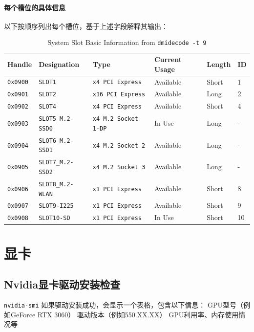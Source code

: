 \paragraph{每个槽位的具体信息}
以下按顺序列出每个槽位，基于上述字段解释其输出：
\begin{table}[h]
    \centering
    \small %
    \setlength{\tabcolsep}{4pt} %
    \begin{tabular}{@{}p{1.5cm}p{2.5cm}p{3cm}p{2cm}p{1.5cm}p{1cm}@{}}
        \toprule
        Handle & Designation & Type & Current Usage & Length & ID \\
        \midrule
        \texttt{0x0900} & \texttt{SLOT1} & \texttt{x4 PCI Express} & Available & Short & 1 \\
        \texttt{0x0901} & \texttt{SLOT2} & \texttt{x16 PCI Express} & Available & Long & 2 \\
        \texttt{0x0902} & \texttt{SLOT4} & \texttt{x4 PCI Express} & Available & Short & 4 \\
        \texttt{0x0903} & \texttt{SLOT5\_M.2-SSD0} & \texttt{x4 M.2 Socket 1-DP} & In Use & Long & - \\
        \texttt{0x0904} & \texttt{SLOT6\_M.2-SSD1} & \texttt{x4 M.2 Socket 2} & Available & Long & - \\
        \texttt{0x0905} & \texttt{SLOT7\_M.2-SSD2} & \texttt{x4 M.2 Socket 3} & Available & Long & - \\
        \texttt{0x0906} & \texttt{SLOT8\_M.2-WLAN} & \texttt{x1 PCI Express} & Available & Short & 8 \\
        \texttt{0x0907} & \texttt{SLOT9-I225} & \texttt{x1 PCI Express} & Available & Short & 9 \\
        \texttt{0x0908} & \texttt{SLOT10-SD} & \texttt{x1 PCI Express} & In Use & Short & 10 \\
        \bottomrule
    \end{tabular}
    \caption{System Slot Basic Information from \texttt{dmidecode -t 9}}
    \label{tab:slot_basic}
\end{table}




\section{显卡}
\subsection{Nvidia显卡驱动安装检查}
\verb|nvidia-smi|
如果驱动安装成功，会显示一个表格，包含以下信息：
GPU型号（例如GeForce RTX 3060）
驱动版本（例如550.XX.XX）
GPU利用率、内存使用情况等





